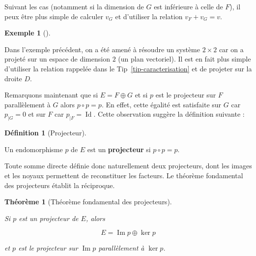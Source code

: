 \documentclass[
  french,
  letterpaper,
  DIV=11,
  numbers=noendperiod]{scrreprt}
\theoremstyle{plain}
\theoremstyle{definition}
\newtheorem{definition}{Définition}[chapter]
\theoremstyle{plain}
\theoremstyle{plain}
\newtheorem{theorem}{Théorème}[chapter]
\theoremstyle{definition}
\theoremstyle{definition}
\newtheorem{example}{Exemple}[chapter]
\theoremstyle{plain}
\theoremstyle{remark}
\newcounter{quartocallouttipno}
\newcommand{\quartocallouttip}[1]{\refstepcounter{quartocallouttipno}\label{#1}}
\begin{document}
\begin{tcolorbox}[enhanced jigsaw, arc=.35mm, bottomrule=.15mm, bottomtitle=1mm, breakable, colback=white, colbacktitle=quarto-callout-tip-color!10!white, colframe=quarto-callout-tip-color-frame, coltitle=black, left=2mm, leftrule=.75mm, opacityback=0, opacitybacktitle=0.6, rightrule=.15mm, title=\textcolor{quarto-callout-tip-color}{\faLightbulb}\hspace{0.5em}{Astuce \ref*{tip-caracterisation}}, titlerule=0mm, toprule=.15mm, toptitle=1mm]

\quartocallouttip{tip-caracterisation} 

Suivant les cas (notamment si la dimension de \(G\) est inférieure à
celle de \(F\)), il peux être plus simple de calculer \(v_G\) et
d'utiliser la relation \(v_{F}+v_{G}=v\).

\end{tcolorbox}

\begin{example}[]\protect\hypertarget{exm-projecteur-F-2}{}\label{exm-projecteur-F-2}

Dans l'exemple précédent, on a été amené à résoudre un système
\(2\times 2\) car on a projeté sur un espace de dimension \(2\) (un plan
vectoriel). Il est en fait plus simple d'utiliser la relation rappelée
dans le Tip~\ref{tip-caracterisation} et de projeter sur la droite
\(D\).

\end{example}

Remarquons maintenant que si \(E = F \oplus G\) et si \(p\) est le
projecteur sur \(F\) parallèlement à \(G\) alors \(p \circ p = p\). En
effet, cette égalité est satisfaite sur \(G\) car \(p_{|G}=0\) et sur
\(F\) car \(p_{|F}=\operatorname{Id}\). Cette observation suggère la
définition suivante :

\begin{definition}[Projecteur]\protect\hypertarget{def-projecteur}{}\label{def-projecteur}

Un endomorphisme \(p\) de \(E\) est un \textbf{projecteur} si
\(p \circ p = p\).

\end{definition}

Toute somme directe définie donc naturellement deux projecteurs, dont
les images et les noyaux permettent de reconstituer les facteurs. Le
théorème fondamental des projecteurs établit la réciproque.

\begin{theorem}[Théorème fondamental des
projecteurs]\protect\hypertarget{thm-projecteur}{}\label{thm-projecteur}

Si \(p\) est un projecteur de \(E\), alors

\[
    E = \operatorname{Im}p \oplus \ker p
\]

et \(p\) est le projecteur sur \(\operatorname{Im}p\) parallèlement à
\(\ker p\).

\end{theorem}
\end{document}
